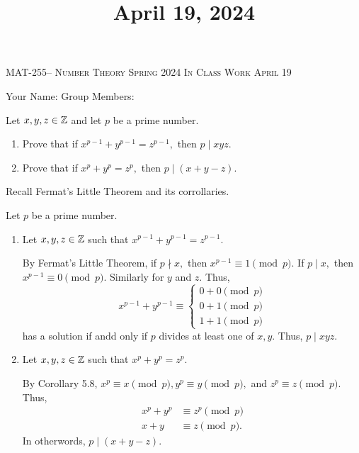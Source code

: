 \documentclass[handout]{ximera}
\title{April 19, 2024}
\begin{document}
\handoutAbstract
\maketitle
 	\begin{center}%
    		{\large \scshape MAT-255-- Number Theory 
			\hfill Spring 2024 
			\hfill In Class Work April 19}%
    
		{\large Your Name: \hrulefill \quad 
			Group Members:\hrulefill \quad 
			\hrulefill
			\par}%
 	\end{center}%
	 

\begin{br}
    Let $x,y,z\in\mathbb Z$ and let $p$ be a prime number.
    
    \begin{enumerate}
        \item Prove that if $x^{p-1}+y^{p-1}=z^{p-1},$ then $p\mid xyz.$
        \item Prove that if $x^{p}+y^{p}=z^{p},$ then $p\mid (x+y-z).$
    \end{enumerate}
    \begin{hint}
        Recall Fermat's Little Theorem and its corrollaries.
    \end{hint}

    \begin{solution}
        Let  $p$ be a prime number.

        \begin{enumerate}
            \item Let $x,y,z\in\mathbb Z$ such that $x^{p-1}+y^{p-1}=z^{p-1}.$ 
            
            By Fermat's Little Theorem, if $p\nmid x,$ then $x^{p-1}\equiv 1\pmod{p}.$ If $p\mid x,$ then $x^{p-1}\equiv 0\pmod{p}.$ Similarly for $y$ and $z.$ Thus, 
            \[x^{p-1}+y^{p-1}\equiv 
                \begin{cases}
                    0 + 0 \pmod{p}\\
                    0 + 1 \pmod{p}\\
                    1 + 1 \pmod{p}
                \end{cases}
            \]
            has a solution if andd only if $p$ divides at least one of $x,y$. Thus, $p\mid xyz.$
            \item Let $x,y,z\in\mathbb Z$ such that $x^{p}+y^{p}=z^{p}.$ 
            
            By Corollary 5.8, $x^{p}\equiv x\pmod{p},  y^p\equiv y\pmod{p},$ and $z^p\equiv z \pmod{p}.$ Thus,
            \begin{align*}
                x^{p}+y^{p}& \equiv z^{p}\pmod{p}\\
                x+y& \equiv z\pmod{p}.
            \end{align*}
            In otherwords, $p\mid (x+y-z).$
        \end{enumerate}
    \end{solution}
\end{br}
\end{document}
